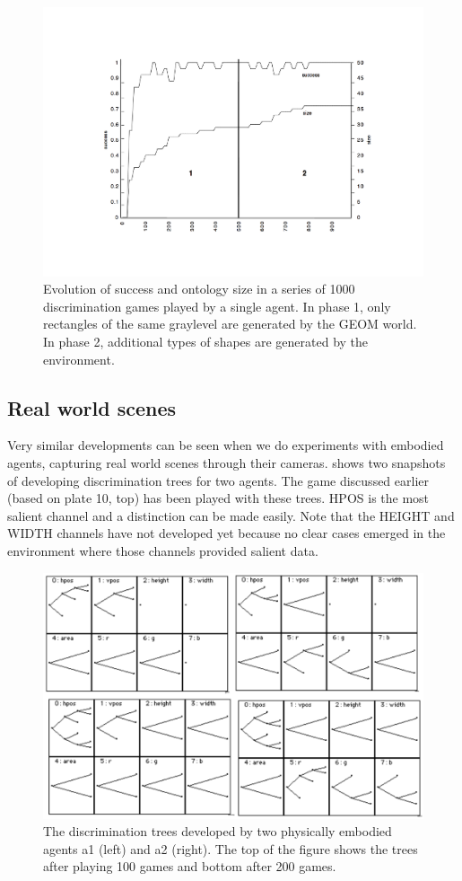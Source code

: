 \begin{figure}[htbp]
  \centerline{\includegraphics[width=.65\textwidth]{chap4/figs/adptwrlglo}}
\caption{\label{adptwrlglo} Evolution of success and ontology
size in a series of 1000 discrimination games played by a single agent.
In phase 1, only rectangles of the same graylevel are 
generated by the GEOM world. In phase 2, additional types of 
shapes are generated by the environment.}
\end{figure}

\subsection{Real world scenes}

Very similar developments can be seen when we do 
experiments with embodied agents, capturing real world scenes
through their cameras.  
shows two snapshots of developing discrimination trees
for two agents. The game discussed earlier (based on 
plate 10, top) has been played with these trees. 
HPOS is the most salient channel and a distinction can 
be made easily. Note that the HEIGHT and WIDTH channels have not 
developed yet because no clear cases emerged 
in the environment where those channels provided 
salient data. 

\begin{figure}[htbp]
  \centerline{\includegraphics[width=.65\textwidth]{chap4/figs/discri200}}
\caption{\label{discri200a} The discrimination trees 
developed by two physically embodied agents 
{\bfshape a1} (left) and {\bfshape a2} (right). The top of the 
figure shows the trees after 
playing 100 games and bottom after 200 games.}
\end{figure}


